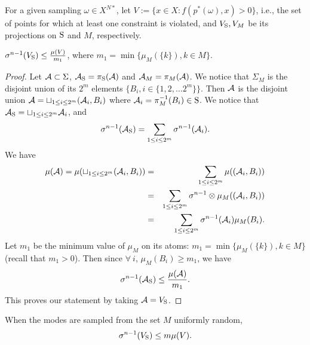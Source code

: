 
For a given sampling $\omega \in X^{N*}$, let $V:=\{x \in X: f(p^*(\omega),x) > 0\}$, i.e., the set of points for which at least one constraint is violated, and $V_{\text{S}}, V_M$ be its projections on $\text{S}$ and $M$, respectively. 

\begin{lemma}$\sigma^{n-1}(V_{\text{S}}) \leq \frac{\mu(V)}{m_1}$, where $m_1 = \min \{\mu_M(\{k\}), k \in M\}$.\end{lemma}
\begin{proof}

Let $\mathcal{A} \subset \Sigma$, $\mathcal{A}_{\text{S}} = \pi_{\text{S}} (\mathcal{A})$ and $\mathcal{A}_M = \pi_M (\mathcal{A})$. We notice that $\Sigma_M$ is the disjoint union of its $2^m$ elements $\{B_i, i \in \{1,2, \ldots 2^m\} \}$. Then $\mathcal{A}$ is the disjoint union $\mathcal{A} = \sqcup_{1 \leq i \leq 2^m} (\mathcal{A}_i, B_i)$ where $\mathcal{A}_i = \pi_M^{-1} (B_i) \in \text{S}$. We notice that 
$\mathcal{A}_{\text{S}} = \sqcup_{1 \leq i \leq 2^m} \mathcal{A}_i$, 
and
\begin{equation*}
\sigma^{n-1} (\mathcal{A}_{\text{S}}) = \sum_{1 \leq i \leq 2^m} \sigma^{n-1} (\mathcal{A}_i).
\end{equation*}
We have 
\begin{eqnarray*}
\mu(\mathcal{A}) = \mu(\sqcup_{1 \leq i \leq 2^m} (\mathcal{A}_i, B_i)) &=& \sum_{1 \leq i \leq 2^m} \mu( (\mathcal{A}_i, B_i)) \\
 &=& \sum_{1 \leq i \leq 2^m} \sigma^{n-1} \otimes \mu_M ((\mathcal{A}_i, B_i)) \\
 & = &\sum_{1 \leq i \leq 2^m} \sigma^{n-1}(\mathcal{A}_i) \mu_M (B_i).
\end{eqnarray*}
Let $m_1$ be the minimum value  of $\mu_M$ on its atoms: $m_1 = \min \{\mu_M(\{k\}), k \in M\}$ (recall that $m_1 > 0$). Then since $ \forall \ i$, $\mu_M(B_i) \geq m_1$, we have
\begin{equation}
\sigma^{n-1}(\mathcal{A}_{\text{S}}) \leq \frac{\mu(\mathcal{A})}{m_1}.
\end{equation}
This proves our statement by taking $\mathcal{A} = V_{\text{S}}$.
\end{proof}

\begin{corollary} \label{cor:measure}When the modes are sampled from the set $M$ uniformly random, 
\begin{equation*}\sigma^{n-1}(V_{\text{S}}) \leq m \mu(V). \end{equation*}
\end{corollary}

